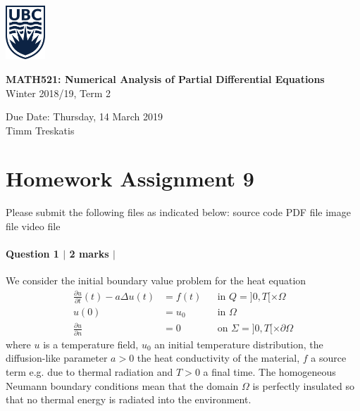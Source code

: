 \documentclass[10pt,letterpaper]{scrartcl}
\begin{document}
\begin{minipage}{.2\textwidth}
\includegraphics[width=42pt]{ubc-logo.png}
\end{minipage}
\hfill
\begin{minipage}{.75\textwidth}
\setlength{\parskip}{6pt}
\begin{flushright}
{
\sffamily
\textbf{MATH521: Numerical Analysis of Partial Differential Equations}\\
Winter 2018/19, Term 2

Due Date: Thursday, 14 March 2019\\
Timm Treskatis
}
\end{flushright}
\end{minipage}

\section*{Homework Assignment 9}

Please submit the following files as indicated below: \hfill \faFileCodeO \: source code \hfill \faFilePdfO \: PDF file \hfill \faFilePictureO \: image file \hfill \faFileMovieO \: video file

\paragraph*{Question 1 $\vert$ 2 marks $\vert$ \faFilePdfO}

We consider the initial boundary value problem for the heat equation
\begin{equation}\tag{H}\label{eq:heat}
\begin{aligned}
\frac{\partial u}{\partial t}(t) - a \Delta u(t) &= f(t) && \text{in } Q = ]0,T[ \times \Omega\\
u(0) &= u_0 && \text{in } \Omega\\
\frac{\partial u}{\partial n} &= 0 && \text{on } \Sigma = ]0,T[ \times \partial \Omega
\end{aligned}
\end{equation}
where $u$ is a temperature field, $u_0$ an initial temperature distribution, the diffusion-like parameter $a > 0$ the heat conductivity of the material, $f$ a source term e.g. due to thermal radiation and $T>0$ a final time. The homogeneous Neumann boundary conditions mean that the domain $\Omega$ is perfectly insulated so that no thermal energy is radiated into the environment.
\end{document}
